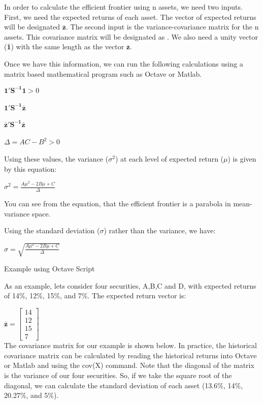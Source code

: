 \documentclass[12pt,a4paper]{article}
\begin{document}
In order to calculate the efficient frontier using n assets, we need two inputs.  First, we need the expected returns of each asset.  The vector of expected returns will be designated $\bar{\mathbf{z}}$.  The second input is the variance-covariance matrix for the n assets.  This covariance matrix will be designated as .  We also need a unity vector ($\bar{\mathbf{1}}$) with the same length as the vector $\bar{\mathbf{z}}$.

Once we have this information, we can run the following calculations using a matrix based mathematical program such as Octave or Matlab.\\
\begin{center}
$\mathbf{{1}'S^{-1}1}>0$\\
~\\
$\mathbf{{1}'S^{-1}\bar{z}}$\\
~\\
$\mathbf{{\bar{z}}'S^{-1}\bar{z}}$\\
~\\
$\Delta =AC-B^{2}>0$
~\\
\end{center}

Using these values, the variance ($\sigma^2$) at each level of expected return ($\mu$) is given by this equation:

$\sigma^2=\frac{A\mu^2-2B\mu+C}{\Delta}$


You can see from the equation, that the efficient frontier is a parabola in mean-variance space.

Using the standard deviation ($\sigma$) rather than the variance, we have:

$\sigma=\sqrt{\frac{A\mu^2-2B\mu+C}{\Delta}}$

Example using Octave Script

As an example, lets consider four securities, A,B,C and D, with expected returns of 14\%, 12\%, 15\%, and 7\%.  The expected return vector is:

$\mathbf{\bar{z}}=\begin{bmatrix} 14\\ 12\\ 15\\ 7 \end{bmatrix}$\\


The covariance matrix for our example is shown below.  In practice, the historical covariance matrix can be calculated by reading the historical returns into Octave or Matlab and using the cov(X) command. Note that the diagonal of the matrix is the variance of our four securities.  So, if we take the square root of the diagonal, we can calculate the standard deviation of each asset (13.6\%, 14\%, 20.27\%, and 5\%).\\
\end{document}
